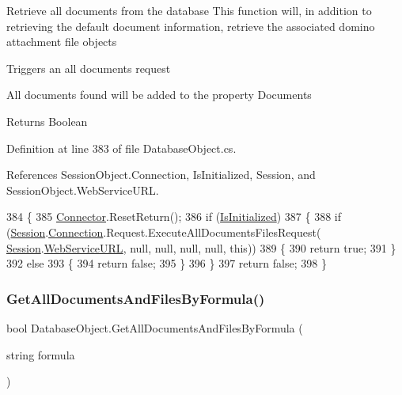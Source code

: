 Retrieve all documents from the database This function will, in addition to retrieving the default document information, retrieve the associated domino attachment file objects 

Triggers an all documents request

All documents found will be added to the property \textquotesingle{}Documents\textquotesingle{}

\begin{DoxyReturn}{Returns}
Boolean
\end{DoxyReturn}


Definition at line 383 of file Database\+Object.\+cs.



References Session\+Object.\+Connection, Is\+Initialized, Session, and Session\+Object.\+Web\+Service\+U\+RL.


\begin{DoxyCode}
384     \{
385         \mbox{\hyperlink{class_connector}{Connector}}.ResetReturn();
386         \textcolor{keywordflow}{if} (\mbox{\hyperlink{class_database_object_a5fe036d32a30eb10d1b3f6a30263f740}{IsInitialized}})
387         \{
388             \textcolor{keywordflow}{if} (\mbox{\hyperlink{class_database_object_aa8484162b7d2a7c4c9426bca13c64c07}{Session}}.\mbox{\hyperlink{class_session_object_a014bdbf705a753540e19bfb53030c55c}{Connection}}.Request.ExecuteAllDocumentsFilesRequest(
      \mbox{\hyperlink{class_database_object_aa8484162b7d2a7c4c9426bca13c64c07}{Session}}.\mbox{\hyperlink{class_session_object_a697c071c812fbf7ad1166b896fb44c16}{WebServiceURL}}, null, null, null, null, \textcolor{keyword}{this}))
389             \{
390                 \textcolor{keywordflow}{return} \textcolor{keyword}{true};
391             \}
392             \textcolor{keywordflow}{else}
393             \{
394                 \textcolor{keywordflow}{return} \textcolor{keyword}{false};
395             \}
396         \}
397         \textcolor{keywordflow}{return} \textcolor{keyword}{false};
398     \}
\end{DoxyCode}
\mbox{\label{class_database_object_ac478ff9264805edc8569d510916c4c00}} 
\subsubsection{\texorpdfstring{Get\+All\+Documents\+And\+Files\+By\+Formula()}{GetAllDocumentsAndFilesByFormula()}}
{\footnotesize\ttfamily bool Database\+Object.\+Get\+All\+Documents\+And\+Files\+By\+Formula (\begin{DoxyParamCaption}\item[{string}]{formula }\end{DoxyParamCaption})}



